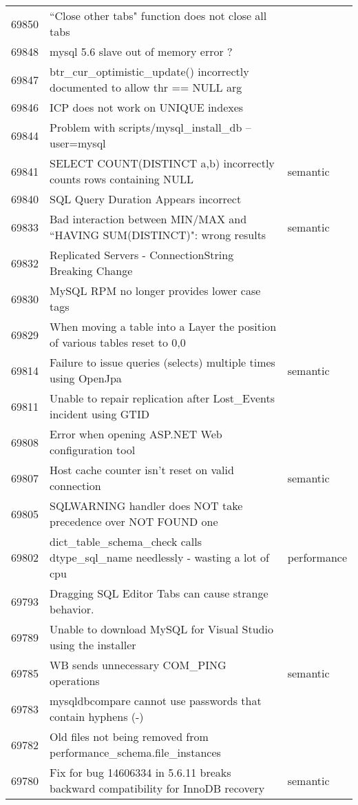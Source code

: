 \begin{longtable}[c]{p{1cm}p{10cm}p{1cm}}
69850 & ``Close other tabs" function does not close all tabs &  \\
69848 & mysql 5.6 slave out of memory error ? &  \\
69847 & btr\_cur\_optimistic\_update() incorrectly documented to allow thr == NULL arg &  \\
69846 & ICP does not work on UNIQUE indexes &  \\
69844 & Problem with scripts/mysql\_install\_db --user=mysql &  \\
69841 & SELECT COUNT(DISTINCT a,b) incorrectly counts rows containing NULL & semantic \\
69840 & SQL Query Duration Appears incorrect &  \\
69833 & Bad interaction between MIN/MAX and ``HAVING SUM(DISTINCT)": wrong results & semantic \\
69832 & Replicated Servers - ConnectionString Breaking Change &  \\
69830 & MySQL RPM no longer provides lower case tags &  \\
69829 & When moving a table into a Layer the position of various tables reset to 0,0 &  \\
69814 & Failure to issue queries (selects) multiple times using OpenJpa & semantic \\
69811 & Unable to repair replication after Lost\_Events incident using GTID &  \\
69808 & Error when opening ASP.NET Web configuration tool &  \\
69807 & Host cache counter isn't reset on valid connection & semantic \\
69805 & SQLWARNING handler does NOT take precedence over NOT FOUND one &  \\
69802 & dict\_table\_schema\_check calls dtype\_sql\_name needlessly - wasting a lot of cpu & performance \\
69793 & Dragging SQL Editor Tabs can cause strange behavior. &  \\
69789 & Unable to download MySQL for Visual Studio using the installer &  \\
69785 & WB sends unnecessary COM\_PING operations & semantic \\
69783 & mysqldbcompare cannot use passwords that contain hyphens (-) &  \\
69782 & Old files not being removed from performance\_schema.file\_instances &  \\
69780 & Fix for bug 14606334 in 5.6.11 breaks backward compatibility for InnoDB recovery & semantic \\

\end{longtable}

